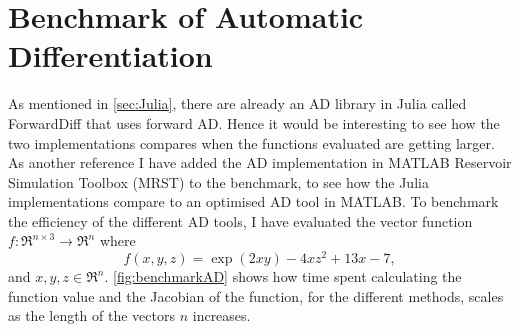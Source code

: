 \section{Benchmark of Automatic Differentiation}
As mentioned in \autoref{sec:Julia}, there are already an AD library in Julia called ForwardDiff \emph{\citep{ForwardDiff}} that uses forward AD. Hence it would be interesting to see how the two implementations compares when the functions evaluated are getting larger. As another reference I have added the AD implementation in MATLAB Reservoir Simulation Toolbox (MRST) \emph{\cite{mrstHomepage}} to the benchmark, to see how the Julia implementations compare to an optimised AD tool in MATLAB. To benchmark the efficiency of the different AD tools, I have evaluated the vector function $f: \Re^{n\times 3} \rightarrow \Re^n $ where
\begin{equation}
\label{eq:benchmarkFunction}
f(x,y,z)  = \exp(2xy) - 4xz^2 + 13x - 7,
\end{equation}
and $x,y,z \in \Re^n$. \autoref{fig:benchmarkAD} shows how time spent calculating the function value and the Jacobian of the function, for the different methods, scales as the length of the vectors $n$ increases.
